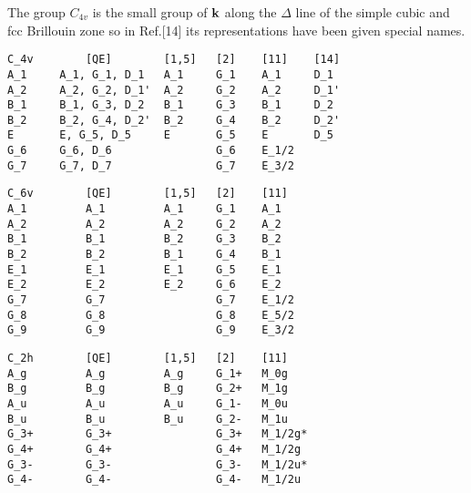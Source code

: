 \documentclass[12pt,a4paper,twoside]{report}
\begin{document}
The group $C_{4v}$ is the small group of ${\bf k}$ along the $\Delta$ line of
the simple cubic and fcc Brillouin zone so in Ref.[14] its representations have 
been given special names.

\begin{tcolorbox}
\begin{footnotesize}
\begin{verbatim}
C_4v        [QE]        [1,5]   [2]    [11]    [14]
A_1     A_1, G_1, D_1   A_1     G_1    A_1     D_1
A_2     A_2, G_2, D_1'  A_2     G_2    A_2     D_1'
B_1     B_1, G_3, D_2   B_1     G_3    B_1     D_2
B_2     B_2, G_4, D_2'  B_2     G_4    B_2     D_2'
E       E, G_5, D_5     E       G_5    E       D_5
G_6     G_6, D_6                G_6    E_1/2
G_7     G_7, D_7                G_7    E_3/2
\end{verbatim}
\end{footnotesize}
\end{tcolorbox}

\begin{tcolorbox}
\begin{footnotesize}
\begin{verbatim}
C_6v        [QE]        [1,5]   [2]    [11]
A_1         A_1         A_1     G_1    A_1
A_2         A_2         A_2     G_2    A_2
B_1         B_1         B_2     G_3    B_2
B_2         B_2         B_1     G_4    B_1
E_1         E_1         E_1     G_5    E_1
E_2         E_2         E_2     G_6    E_2
G_7         G_7                 G_7    E_1/2
G_8         G_8                 G_8    E_5/2
G_9         G_9                 G_9    E_3/2
\end{verbatim}
\end{footnotesize}
\end{tcolorbox}

\begin{tcolorbox}
\begin{footnotesize}
\begin{verbatim}
C_2h        [QE]        [1,5]   [2]    [11] 
A_g         A_g         A_g     G_1+   M_0g
B_g         B_g         B_g     G_2+   M_1g
A_u         A_u         A_u     G_1-   M_0u
B_u         B_u         B_u     G_2-   M_1u
G_3+        G_3+                G_3+   M_1/2g*
G_4+        G_4+                G_4+   M_1/2g
G_3-        G_3-                G_3-   M_1/2u*
G_4-        G_4-                G_4-   M_1/2u
\end{verbatim}
\end{footnotesize}
\end{tcolorbox}
\end{document}
